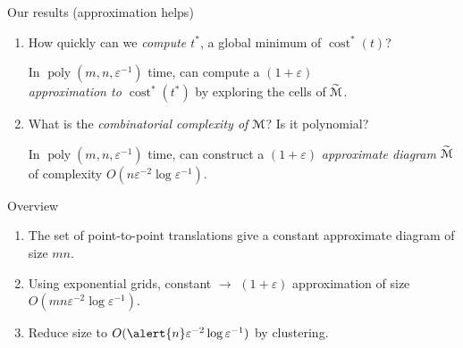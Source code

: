 \documentclass[xcolor={dvipsnames,usenames}]{beamer}
\newcommand{\eps}{\varepsilon}
\DeclareMathOperator{\poly}{poly}
\DeclareMathOperator{\cost}{cost}
\newcommand{\M}{\EuScript{M}}
\newcommand{\tildeM}{\widetilde{\EuScript{M}}}
\def\EMPH#1{\textcolor{BrickRed}{{\emph{#1}}}}
\begin{document}
\begin{frame}{Our results (approximation helps)}
\begin{enumerate}
\item {\large How quickly can we \EMPH{compute $t^*$}, a global minimum of $\cost^*(t)$?}
	\begin{theorem}
	In $\poly(m, n, \eps^{-1})$ time, can compute a $(1+\eps)$ \\
	\EMPH{approximation to $\cost^*(t^*)$} by exploring the cells of $\tildeM$.
	\end{theorem}
\item {\large What is the \EMPH{combinatorial complexity of $\M$}? Is it polynomial?}
	\begin{theorem}
	In $\poly(m, n, \eps^{-1})$ time, can construct a $(1+\eps)$
	\EMPH{approximate diagram} $\tildeM$ of complexity
	$O(n\eps^{-2}\log\eps^{-1})$.
	\end{theorem}
\end{enumerate}
\end{frame}

\begin{frame}{Overview}
\begin{enumerate}
\item The set of \alert{point-to-point translations} give a constant
	approximate diagram of size $mn$.
\pause
\item Using exponential grids, constant $\rightarrow$ \alert{$(1+\eps)$ approximation}
	of size $O(mn\eps^{-2}\log\eps^{-1})$.
\pause
\item Reduce size to $O(\alert{n}\eps^{-2}\log\eps^{-1})$ by clustering.
\end{enumerate}
\end{frame}
\end{document}
